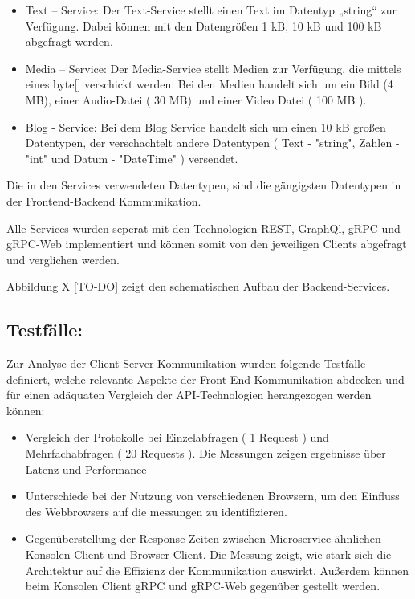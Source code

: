 \begin{itemize}
	\item Text – Service: 
	Der Text-Service stellt einen Text im Datentyp „string“ zur Verfügung. Dabei können mit den Datengrößen 1 kB, 10 kB und 100 kB abgefragt werden.
	
	\item Media – Service:
	Der Media-Service stellt Medien zur Verfügung, die mittels eines byte[] verschickt werden. Bei den Medien handelt sich um ein Bild (4 MB), einer Audio-Datei ( 30 MB) und einer Video Datei ( 100 MB ). 
	
	\item Blog - Service: 
	Bei dem Blog Service handelt sich um einen 10 kB großen Datentypen, der verschachtelt andere Datentypen ( Text - "string", Zahlen - "int" und Datum - "DateTime" ) versendet.
	
\end{itemize}

Die in den Services verwendeten Datentypen, sind die gängigsten Datentypen in der Frontend-Backend Kommunikation.

Alle Services wurden seperat mit den Technologien REST, GraphQl, gRPC und gRPC-Web implementiert und können somit von den jeweiligen Clients abgefragt und verglichen werden.

Abbildung X [TO-DO] zeigt den schematischen Aufbau der Backend-Services.

\subsection*{Testfälle:}
Zur Analyse der Client-Server Kommunikation wurden folgende Testfälle definiert, welche relevante Aspekte der Front-End Kommunikation abdecken und für einen adäquaten Vergleich der API-Technologien herangezogen werden können: 
\begin{itemize}
	\item Vergleich der Protokolle bei Einzelabfragen ( 1 Request ) und Mehrfachabfragen ( 20 Requests ). Die Messungen zeigen ergebnisse über Latenz und Performance
	\item Unterschiede bei der Nutzung von verschiedenen Browsern, um den Einfluss des Webbrowsers auf die messungen zu identifizieren.
	\item Gegenüberstellung der Response Zeiten zwischen Microservice ähnlichen Konsolen Client und Browser Client. Die Messung zeigt, wie stark sich die Architektur auf die Effizienz der Kommunikation auswirkt. Außerdem können beim Konsolen Client gRPC und gRPC-Web gegenüber gestellt werden.
\end{itemize}


